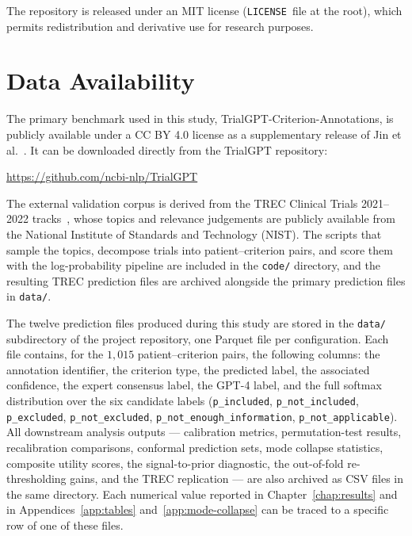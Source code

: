 The repository is released under an MIT license 
(\texttt{LICENSE}~file at the root), which permits redistribution 
and derivative use for research purposes.

\section{Data Availability}
\label{sec:app-data}

The primary benchmark used in this study, 
TrialGPT-Criterion-Annotations, is publicly available under a CC BY 
4.0 license as a supplementary release of Jin et 
al.~\cite{jin2024trialgpt}. It can be downloaded directly from the 
TrialGPT repository:

\begin{center}
    \url{https://github.com/ncbi-nlp/TrialGPT}
\end{center}

The external validation corpus is derived from the TREC Clinical 
Trials 2021--2022 tracks~\cite{roberts2021trec, roberts2022trec}, whose 
topics and relevance judgements are publicly available from the 
National Institute of Standards and Technology (NIST). The scripts that 
sample the topics, decompose trials into patient--criterion pairs, and 
score them with the log-probability pipeline are included in the 
\texttt{code/} directory, and the resulting TREC prediction files are 
archived alongside the primary prediction files in \texttt{data/}.

The twelve prediction files produced during this study are stored in 
the \texttt{data/} subdirectory of the project repository, one 
Parquet file per configuration. Each file contains, for the $1{,}015$ 
patient--criterion pairs, the following columns: the annotation 
identifier, the criterion type, the predicted label, the associated 
confidence, the expert consensus label, the GPT-4 label, and the 
full softmax distribution over the six candidate labels 
(\texttt{p\_included}, \texttt{p\_not\_included}, \texttt{p\_excluded}, 
\texttt{p\_not\_excluded}, \texttt{p\_not\_enough\_information}, 
\texttt{p\_not\_applicable}). All downstream analysis outputs --- 
calibration metrics, permutation-test results, recalibration 
comparisons, conformal prediction sets, mode collapse statistics, 
composite utility scores, the signal-to-prior diagnostic, the 
out-of-fold re-thresholding gains, and the TREC replication --- are 
also archived as CSV files in the same directory. Each numerical value 
reported in Chapter~\ref{chap:results} and in Appendices~\ref{app:tables} 
and~\ref{app:mode-collapse} can be traced to a specific row of one of 
these files.


